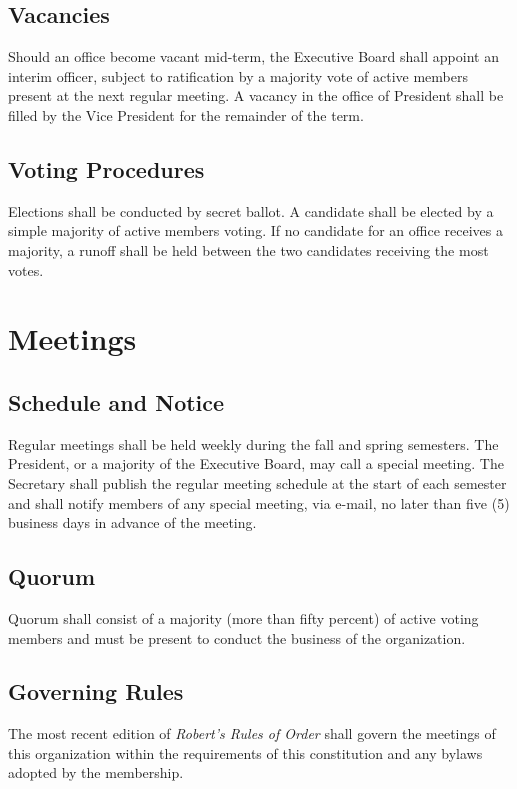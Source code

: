 \documentclass[12pt,letterpaper]{article} %
\begin{document}
\subsection{Vacancies}\label{sec:vacancies}
Should an office become vacant mid-term, the Executive Board shall appoint an interim officer,
subject to ratification by a majority vote of active members present at the next regular
meeting. A vacancy in the office of President shall be filled by the Vice President for the
remainder of the term.
\subsection{Voting Procedures}\label{sec:voting-procedures}
Elections shall be conducted by secret ballot. A candidate shall be elected by a simple
majority of active members voting. If no candidate for an office receives a majority, a runoff
shall be held between the two candidates receiving the most votes.

\section{Meetings}\label{art:meetings}
\subsection{Schedule and Notice}\label{sec:meeting-schedule}
Regular meetings shall be held weekly during the fall and spring semesters. The President,
or a majority of the Executive Board, may call a special meeting. The Secretary shall publish
the regular meeting schedule at the start of each semester and shall notify members of any
special meeting, via e-mail, no later than five (5) business days in advance of the meeting.
\subsection{Quorum}\label{sec:quorum}
Quorum shall consist of a majority (more than fifty percent) of active voting members and must
be present to conduct the business of the organization.
\subsection{Governing Rules}\label{sec:governing-rules}
The most recent edition of \textit{Robert's Rules of Order} shall govern the meetings of this
organization within the requirements of this constitution and any bylaws adopted by the
membership.
\end{document}
